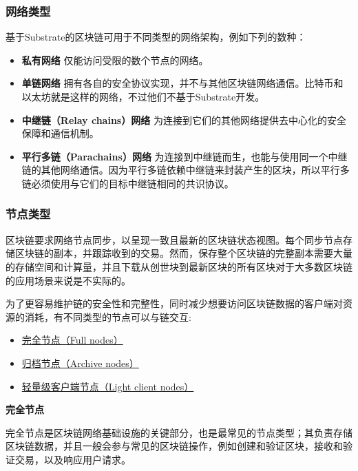 \hypertarget{ux7f51ux7edcux7c7bux578b}{%
\subsubsection{网络类型}\label{ux7f51ux7edcux7c7bux578b}}

基于Substrate的区块链可用于不同类型的网络架构，例如下列的数种：

\begin{itemize}
\item
  \textbf{私有网络} 仅能访问受限的数个节点的网络。
\item
  \textbf{单链网络}
  拥有各自的安全协议实现，并不与其他区块链网络通信。比特币和以太坊就是这样的网络，不过他们不基于Substrate开发。
\item
  \textbf{中继链（Relay chains）网络}
  为连接到它们的其他网络提供去中心化的安全保障和通信机制。
\item
  \textbf{平行多链（Parachains）网络}
  为连接到中继链而生，也能与使用同一个中继链的其他网络通信。因为平行多链依赖中继链来封装产生的区块，所以平行多链必须使用与它们的目标中继链相同的共识协议。
\end{itemize}

\hypertarget{ux8282ux70b9ux7c7bux578b}{%
\subsubsection{节点类型}\label{ux8282ux70b9ux7c7bux578b}}

区块链要求网络节点同步，以呈现一致且最新的区块链状态视图。每个同步节点存储区块链的副本，并跟踪收到的交易。然而，保存整个区块链的完整副本需要大量的存储空间和计算量，并且下载从创世块到最新区块的所有区块对于大多数区块链的应用场景来说是不实际的。

为了更容易维护链的安全性和完整性，同时减少想要访问区块链数据的客户端对资源的消耗，有不同类型的节点可以与链交互:

\begin{itemize}
\item
  \protect\hyperlink{}{完全节点（Full nodes）}
\item
  \protect\hyperlink{}{归档节点（Archive nodes）}
\item
  \protect\hyperlink{}{轻量级客户端节点（Light client nodes）}
\end{itemize}

\hypertarget{ux5b8cux5168ux8282ux70b9}{%
\textbf{完全节点}\label{ux5b8cux5168ux8282ux70b9}}

完全节点是区块链网络基础设施的关键部分，也是最常见的节点类型；其负责存储区块链数据，并且一般会参与常见的区块链操作，例如创建和验证区块，接收和验证交易，以及响应用户请求。

